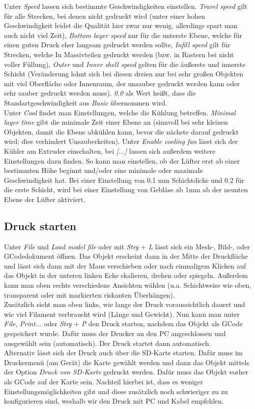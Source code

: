 \documentclass[11pt,a4paper]{scrartcl}
\begin{document}
Unter \textit{Speed} lassen sich bestimmte Geschwindigkeiten einstellen. \textit{Travel speed} gilt für alle Strecken, bei denen nicht gedruckt wird (unter einer hohen Geschwindigkeit leidet die Qualität hier zwar nur wenig, allerdings spart man auch nicht viel Zeit), \textit{Bottom layer speed} nur für die unterste Ebene, welche für einen guten Druck eher langsam gedruckt werden sollte, \textit{Infill speed} gilt für Strecken, welche In Massivteilen gedruckt werden (bzw. in Rastern bei nicht voller Füllung), \textit{Outer} und \textit{Inner shell speed} gelten für die äußerste und innerste Schicht (Veränderung lohnt sich bei diesen dreien nur bei sehr großen Objekten mit viel Oberfläche oder Innenraum, der unsauber gedruckt werden kann oder sehr sauber gedruckt werden muss). \textit{0.0} als Wert heißt, dass die Standartgeschwindigkeit aus \textit{Basic} übernommen wird. \\
Unter \textit{Cool} findet man Einstellungen, welche die Kühlung betreffen. \textit{Minimal layer time} gibt die minimale Zeit einer Ebene an (sinnvoll bei sehr kleinen Objekten, damit die Ebene abkühlen kann, bevor die nächste darauf gedruckt wird; dies verhindert Unsauberkeiten). Unter \textit{Enable cooling fan} lässt sich der Kühler am Extruder einschalten, bei \textit{[...]} lassen sich außerdem weitere Einstellungen dazu finden. So kann man einstellen, ob der Lüfter erst ab einer bestimmten Höhe beginnt und/oder eine minimale oder maximale Geschwindigkeit hat. Bei einer Einstellung von 0.1 mm Schichtdicke und 0.2 für die erste Schicht, wird bei einer Einstellung von Gebläse ab 1mm ab der neunten Ebene der Lüfter aktiviert.
\subsection{Druck starten}
Unter \textit{File} und \textit{Load model file} oder mit \textit{Strg} + \textit{L} lässt sich ein Mesh-, Bild-, oder GCodedokument öffnen. Das Objekt erscheint dann in der Mitte der Druckfläche und lässt sich dann mit der Maus verschieben oder nach einmaligem Klicken auf das Objekt in der unteren linken Ecke skalieren, drehen oder spiegeln. Außerdem kann man oben rechts verschiedene Ansichten wählen (u.a. Schichtweise wie oben, transparent oder mit markierten riskanten Überhängen).\\
Zusätzlich sieht man oben links, wie lange der Druck voraussichtlich dauert und wie viel Filament verbraucht wird (Länge und Gewicht). Nun kann man unter \textit{File}, \textit{Print...} oder \textit{Strg} + \textit{P} den Druck starten, nachdem das Objekt als GCode gespeichert wurde. Dafür muss der Drucker an den PC angeschlossen und ausgewählt sein (automatisch). Der Druck startet dann automatisch.\\
Alternativ lässt sich der Druck auch über die SD-Karte starten. Dafür muss im Druckermenü (am Gerät) die Karte gewählt werden und dann das Objekt mittels der Option \textit{Druck von SD-Karte} gedruckt werden. Dafür muss das Objekt vorher als GCode auf der Karte sein. Nachteil hierbei ist, dass es weniger Einstellungsmöglichkeiten gibt und diese zusätzlich noch schwieriger zu zu konfigurieren sind, weshalb wir den Druck mit PC und Kabel empfehlen. 
\pagebreak
\end{document}
